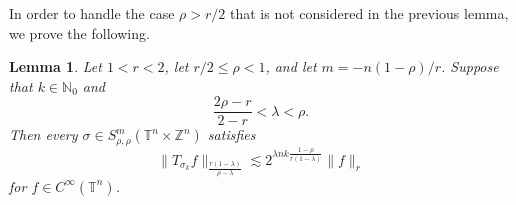 \documentclass[12pt, reqno]{amsart}
\newtheorem{lemma}[theorem]{Lemma}
\theoremstyle{definition}
\theoremstyle{remark}
\numberwithin{equation}{section}
\begin{document}
In order to handle the case $\rho > r/2$ that is not considered in the previous lemma, we prove the following.
\begin{lemma}
    Let $1<r<2$, let $r/2\leq\rho<1$, and let $m=-n(1-\rho)/r$. Suppose that $k\in\mathbb{N}_0$ and 
    \begin{equation*}
        \frac{2\rho-r}{2-r} < \lambda < \rho.
    \end{equation*}
    Then every $\sigma \in S^m_{\rho,\rho}(\mathbb{T}^n \times \mathbb{Z}^n) $ satisfies 
    \begin{equation*}
        \|T_{\sigma_k}f\|_{\frac{r(1-\lambda)}{\rho-\lambda} } \lesssim 2^{\lambda nk \frac{1-\rho}{r(1-\lambda)}} \|f\|_r
    \end{equation*}
    for $f\in C^\infty(\mathbb{T}^n)$.
    \label{lem:Lr-lambda-boundedness}
\end{lemma}
\end{document}
